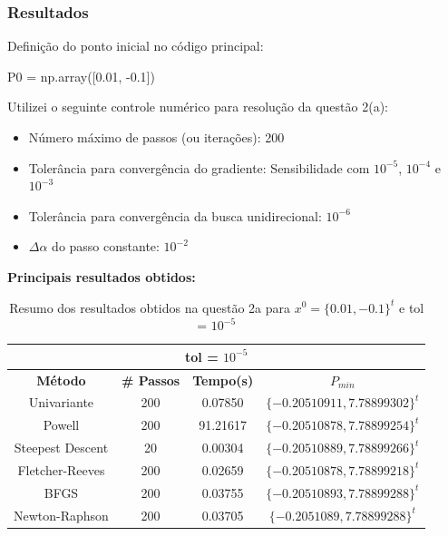 \documentclass[10pt, a4paper]{article}
\begin{document}
\subsubsection{Resultados}

Definição do ponto inicial no código principal:
\begin{python}
  P0 = np.array([0.01, -0.1])
\end{python}

Utilizei o seguinte controle numérico para resolução da questão 2(a):
\begin{itemize}
  \item Número máximo de passos (ou iterações): 200
  \item Tolerância para convergência do gradiente: Sensibilidade com $10^{-5}$, $10^{-4}$ e $10^{-3}$
  \item Tolerância para convergência da busca unidirecional: $10^{-6}$
  \item $\Delta\alpha$ do passo constante: $10^{-2}$
\end{itemize}

\vspace{3mm}
\textbf{Principais resultados obtidos:}

\begin{table}[H]
  \begin{center}
    \begin{tabular}{c|c|c|c}
      \multicolumn{4}{c}{tol = $10^{-5}$}\\
      \hline
      \textbf{Método} & \textbf{\# Passos} & \textbf{Tempo(s)} & \textbf{$P_{min}$}\\
      \hline
      Univariante       & 200   & 0.07850 & $\{-0.20510911, 7.78899302\}^t$\\
      Powell            & 200   & 91.21617 & $\{-0.20510878, 7.78899254\}^t$\\
      Steepest Descent  & 20    & 0.00304 & $\{-0.20510889, 7.78899266\}^t$\\
      Fletcher-Reeves   & 200   & 0.02659 & $\{-0.20510878, 7.78899218\}^t$\\
      BFGS              & 200   & 0.03755 & $\{-0.20510893, 7.78899288\}^t$\\
      Newton-Raphson    & 200   & 0.03705 & $\{-0.2051089, 7.78899288\}^t$\\
    \end{tabular}
  \end{center}
  \caption{Resumo dos resultados obtidos na questão 2a para $x^0 = \{0.01,-0.1\}^t$ e tol = $10^{-5}$}
\end{table}
\end{document}

